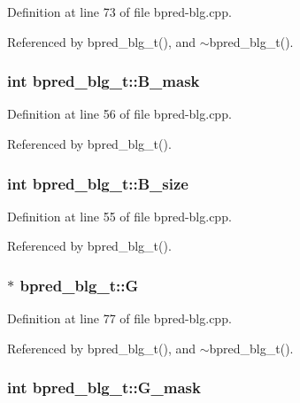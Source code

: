 Definition at line 73 of file bpred-blg.cpp.

Referenced by bpred\_\-blg\_\-t(), and $\sim$bpred\_\-blg\_\-t().
\subsubsection[{B\_\-mask}]{\setlength{\rightskip}{0pt plus 5cm}int {\bf bpred\_\-blg\_\-t::B\_\-mask}\hspace{0.3cm}{\tt  [protected]}}\label{classbpred__blg__t_98a2c53b2e0d05c1bcd6a4db6d11fa98}




Definition at line 56 of file bpred-blg.cpp.

Referenced by bpred\_\-blg\_\-t().
\subsubsection[{B\_\-size}]{\setlength{\rightskip}{0pt plus 5cm}int {\bf bpred\_\-blg\_\-t::B\_\-size}\hspace{0.3cm}{\tt  [protected]}}\label{classbpred__blg__t_f648987d5313f2afd8070d12c4069b70}




Definition at line 55 of file bpred-blg.cpp.

Referenced by bpred\_\-blg\_\-t().
\subsubsection[{G}]{$\ast$ {\bf bpred\_\-blg\_\-t::G}\hspace{0.3cm}{\tt  [protected]}}\label{classbpred__blg__t_f39a760b77995da6546b1d5dd873f4a2}




Definition at line 77 of file bpred-blg.cpp.

Referenced by bpred\_\-blg\_\-t(), and $\sim$bpred\_\-blg\_\-t().
\subsubsection[{G\_\-mask}]{\setlength{\rightskip}{0pt plus 5cm}int {\bf bpred\_\-blg\_\-t::G\_\-mask}\hspace{0.3cm}{\tt  [protected]}}\label{classbpred__blg__t_55d5dca93ca4ba38e6bf55093d72ea01}




